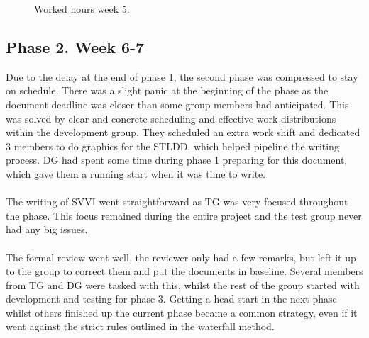 \documentclass{article}
\begin{document}
\begin{figure}[!htb]
              \caption{Worked hours week 5.}\label{fig:week5}
            \endminipage
        \end{figure}

    \subsection{Phase 2. Week 6-7 \label{phase2}}
        Due to the delay at the end of phase 1, the second phase was compressed to stay on schedule. 
        There was a slight panic at the beginning of the phase as the document deadline was closer than some group 
        members had anticipated. This was solved by clear and concrete scheduling and effective work distributions within the development group. They scheduled an extra work shift and dedicated 3 members to do graphics for
        the STLDD, which helped pipeline the writing process. DG had spent some time during phase 1 preparing for 
        this document, which gave them a running start when it was time to write.
        \\ \\
        The writing of SVVI went straightforward as TG was very focused throughout the phase. This focus remained
        during the entire project and the test group never had any big issues.
        \\ \\
        The formal review went well, the reviewer only had a few remarks, but left it up to the group to correct them and put the documents in baseline.
        Several members from TG and DG were tasked with this, whilst the rest of the group
        started with development and testing for phase 3. Getting a head start in the next phase whilst others finished up the current
        phase became a common strategy, even if it went against the strict rules outlined in the waterfall method.
        
\end{document}

